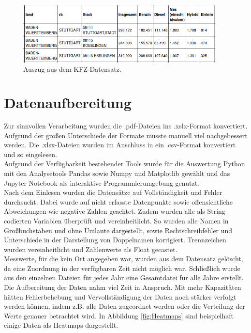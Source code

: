 \documentclass[11pt,a4paper,oneside,german]{article}
\begin{document}
	\begin{figure}[h!]
		\centering
		\includegraphics[width=10.5cm]{BeispielKFZ.png}
		\caption{Auszug aus dem KFZ-Datensatz.}
		\label{fig:BeispielKFZ}
	\end{figure}
	
	\section{Datenaufbereitung}
	
	Zur sinnvollen Verarbeitung wurden die .pdf-Dateien ins .xslx-Format konvertiert. Aufgrund der großen Unterschiede der Formate musste manuell viel nachgebessert werden. Die .xlsx-Dateien wurden im Anschluss in ein .csv-Format konvertiert und so eingelesen.\\
	Aufgrund der Verfügbarkeit bestehender Tools wurde für die Auswertung Python mit den Analysetools Pandas sowie Numpy und Matplotlib gewählt und das Jupyter Notebook als interaktive Programmierumgebung genutzt.\\
	Nach dem Einlesen wurden die Datensätze auf Vollständigkeit und Fehler durchsucht. Dabei wurde auf nicht erfasste Datenpunkte sowie offensichtliche Abweichungen wie negative Zahlen geachtet. Zudem wurden alle als String codierten Variablen überprüft und vereinheitlicht. So wurden alle Namen in Großbuchstaben und ohne Umlaute dargestellt, sowie Rechtschreibfehler und Unterschiede in der Darstellung von Doppelnamen korrigiert. Trennzeichen wurden vereinheitlicht und Zahlenwerte als Float gecastet. \\
	Messwerte, für die kein Ort angegeben war, wurden aus dem Datensatz gelöscht, da eine Zuordnung in der verfügbaren Zeit nicht möglich war. Schließlich wurde aus den einzelnen Dateien für jedes Jahr eine Gesamtdatei für alle Jahre erstellt. \\
	Die Aufbereitung der Daten nahm viel Zeit in Anspruch. Mit mehr Kapazitäten hätten Fehlerbehebung und Vervollständigung der Daten noch stärker verfolgt werden können, indem z.B. alle Daten zugeordnet werden oder die Verteilung der Werte genauer betrachtet wird. In Abbildung \ref{fig:Heatmaps} sind beispielhaft einige Daten als Heatmaps dargestellt.
	
\end{document}
